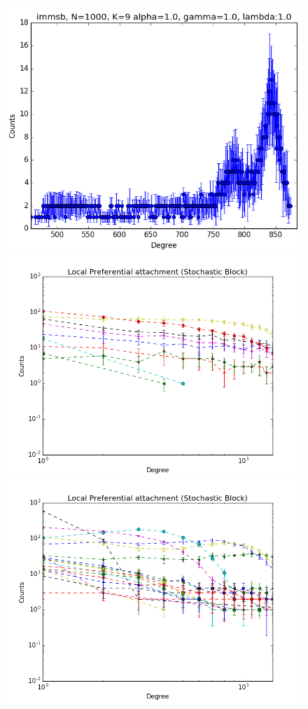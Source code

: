 \documentclass[a4paper, 12pt]{article}
\begin{document}
\begin{figure}[ht]
	\endminipage
	\includegraphics[scale=0.27]{img/M_g_regular/figure_1}
	\endminipage
		\vspace{-0.29cm}
	\includegraphics[scale=0.27]{img/M_g_peaks/figure_3}
	\endminipage
	\includegraphics[scale=0.27]{img/M_g_power_law/figure_3} 

\end{figure}
\end{document}
